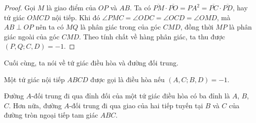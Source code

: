 \begin{center}
    \end{center}

    \begin{proof}
        Gọi \(M\) là giao điểm của \(OP\) và \(AB\). Ta có \(\overline{PM} \cdot \overline{PO} = PA^2 = \overline{PC} \cdot \overline{PD}\), hay tứ giác \(OMCD\) nội tiếp. Khi đó \(\angle PMC = \angle ODC = \angle OCD = \angle OMD\), mà \(AB \perp OP\) nên ta có \(MQ\) là phân giác trong của góc \(CMD\), đồng thời \(MP\) là phân giác ngoài của góc \(CMD\). Theo tính chất về hàng phân giác, ta thu được \((P,Q;C,D) = -1\).
    \end{proof}

    Cuối cùng, ta nói về tứ giác điều hòa và đường đối trung.

    \begin{definition}
        Một tứ giác nội tiếp \(ABCD\) được gọi là điều hòa nếu \((A,C;B,D) = -1\).
    \end{definition}

    \begin{property}
        Đường \(A\)-đối trung đi qua đỉnh đối của một tứ giác điều hòa có ba đỉnh là \(A\), \(B\), \(C\). Hơn nữa, đường \(A\)-đối trung đi qua giao của hai tiếp tuyến tại \(B\) và \(C\) của đường tròn ngoại tiếp tam giác \(ABC\).
    \end{property}

